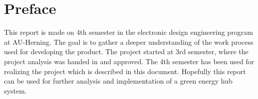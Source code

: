 \section*{Preface}
This report is made on 4th semester in the electronic design engineering program at AU-Herning. The goal is to gather a deeper understanding of the work process used for developing the product. The project started at 3rd semester, where the project analysis was handed in and approved. The 4th semester has been used for realizing the project which is described in this document. 
\p
Hopefully this report can be used for further analysis and implementation of a green energy hub system.